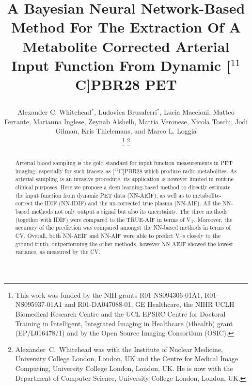 \documentclass{IEEEtran}
\begin{document}
\title{
    \vspace{-0.75cm}
    
    A Bayesian Neural Network-Based Method For The Extraction Of A Metabolite Corrected Arterial Input Function From Dynamic [$^{11}$C]PBR28 PET 
}

\author{
    \vspace{-0.25cm}
    
    Alexander C. Whitehead$^{*}$,
    Ludovica Brusaferri$^{*}$,
    Lucia Maccioni,
    Matteo Ferrante,
    Marianna Inglese,
    Zeynab Alshelh,
    Mattia Veronese,
    Nicola Toschi,
    Jodi Gilman,
    Kris Thielemans, and
    Marco L. Loggia

    \vspace{-0.75cm}
    
    \thanks{This work was funded by the NIH grants R01-NS094306-01A1, R01-NS095937-01A1 and R01-DA047088-01, GE Healthcare, the NIHR UCLH Biomedical Research Centre and the UCL EPSRC Centre for Doctoral Training in Intelligent, Integrated Imaging in Healthcare (i4health) grant (EP/L016478/1) and by the Open Source Imaging Consortium (OSIC).}
    \thanks{Alexander~C.~Whitehead was with the Institute of Nuclear Medicine, University College London, London, UK and the Centre for Medical Image Computing, University College London, London, UK. He is now with the Department of Computer Science, University College London, London, UK.} %
}

\pagestyle{plain}

\maketitle

\begin{abstract}
    Arterial blood sampling is the gold standard for input function measurements in PET imaging, especially for such tracers as [$^{11}$C]PBR28 which produce radio-metabolites. As arterial sampling is an invasive procedure, its application is however limited in routine clinical purposes. Here we propose a deep learning-based method to directly estimate the input function from dynamic PET data (NN-AEIF), as well as to metabolite-correct the IDIF (NN-IDIF) and the un-corrected true plasma (NN-AIF). All the NN-based methods not only output a signal but also its uncertainty. The three methods (together with IDIF) were compared to the TRUE-AIF in terms of V{$_\mathrm{T}$}.  Moreover, the accuracy of the prediction was compared amongst the NN-based methods in terms of CV. Overall, both NN-AEIF and NN-AIF were able to predict V{$_\mathrm{T}$}s closely to the ground-truth, outperforming the other methods, however NN-AEIF showed the lowest variance, as measured by the CV.
\end{abstract}







\vspace{-0.5cm}

\AtNextBibliography{\scriptsize}
\printbibliography
\end{document}
